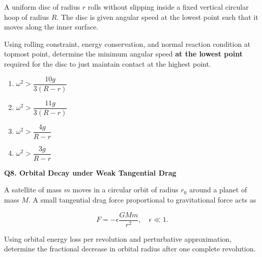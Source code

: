 \documentclass[12pt]{article}
\begin{document}
A uniform disc of radius $r$ rolls without slipping inside a fixed vertical circular hoop of radius $R$. The disc is given angular speed at the lowest point such that it moves along the inner surface.  

Using rolling constraint, energy conservation, and normal reaction condition at topmost point, determine the minimum angular speed \textbf{at the lowest point} required for the disc to just maintain contact at the highest point.
\begin{center}
\end{center}

\begin{enumerate}
\item[(A)] $\omega^2>\dfrac{10g}{3(R-r)}$
\item[(B)] $\omega^2>\dfrac{11g}{3(R-r)}$
\item[(C)] $\omega^2>\dfrac{4g}{R-r}$
\item[(D)] $\omega^2>\dfrac{3g}{R-r}$
\end{enumerate}


\textbf{Q8. Orbital Decay under Weak Tangential Drag}

A satellite of mass $m$ moves in a circular orbit of radius $r_0$ around a planet of mass $M$. A small tangential drag force proportional to gravitational force acts as  

\[
F = -\epsilon \frac{GMm}{r^2}, \quad \epsilon \ll 1.
\]

Using orbital energy loss per revolution and perturbative approximation, determine the fractional decrease in orbital radius after one complete revolution.
\end{document}
